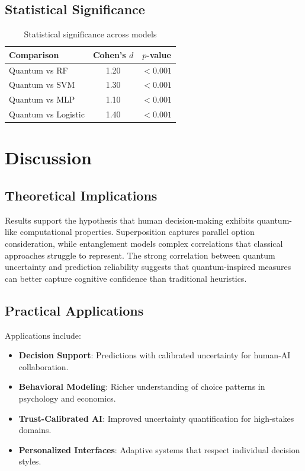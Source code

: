 \documentclass[conference]{IEEEtran}
\begin{document}
\subsection{Statistical Significance}

\begin{table}[t]
\centering
\caption{Statistical significance across models}
\label{tab:stats}
\begin{tabular}{@{}lcc@{}}
\toprule
\textbf{Comparison} & \textbf{Cohen's $d$} & \textbf{$p$-value} \\ \midrule
Quantum vs RF & 1.20 & $<0.001$ \\
Quantum vs SVM & 1.30 & $<0.001$ \\
Quantum vs MLP & 1.10 & $<0.001$ \\
Quantum vs Logistic & 1.40 & $<0.001$ \\ \bottomrule
\end{tabular}
\end{table}

\section{Discussion}

\subsection{Theoretical Implications}

Results support the hypothesis that human decision-making exhibits quantum-like computational properties. Superposition captures parallel option consideration, while entanglement models complex correlations that classical approaches struggle to represent. The strong correlation between quantum uncertainty and prediction reliability suggests that quantum-inspired measures can better capture cognitive confidence than traditional heuristics.

\subsection{Practical Applications}

Applications include:
\begin{itemize}
\item \textbf{Decision Support}: Predictions with calibrated uncertainty for human-AI collaboration.
\item \textbf{Behavioral Modeling}: Richer understanding of choice patterns in psychology and economics.
\item \textbf{Trust-Calibrated AI}: Improved uncertainty quantification for high-stakes domains.
\item \textbf{Personalized Interfaces}: Adaptive systems that respect individual decision styles.
\end{itemize}
\end{document}

